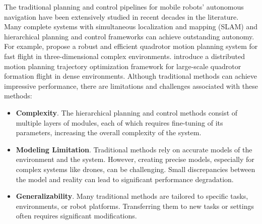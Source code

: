 \documentclass{article}
\newcommand{\TB}[1]{\textbf{#1}}
\begin{document}
The traditional planning and control pipelines for mobile robots' 
autonomous navigation have been extensively studied in recent
decades in the literature. 
Many complete systems with simultaneous localization 
and mapping (SLAM) and hierarchical 
planning and control frameworks can achieve outstanding 
autonomy.
For example, {\textcite{zhou2019robust}} propose a robust and efficient 
quadrotor motion planning system for fast flight in 
three-dimensional complex environments.
{\textcite{quan2023robust}} introduce a distributed motion planning 
trajectory optimization framework for large-scale quadrotor 
formation flight in dense environments.
Although traditional methods can achieve impressive performance, 
there are limitations and challenges associated with these methods: 
\begin{itemize}
  \item \TB{Complexity}. The hierarchical planning and control 
  methods consist of multiple layers of modules,   
  each of which requires fine-tuning of 
  its parameters, increasing the overall complexity of the system.
  \item \TB{Modeling Limitation}. Traditional methods rely on 
  accurate models of the environment and the system. However, 
  creating precise models, especially for complex systems like 
  drones, can be challenging. Small discrepancies between the 
  model and reality can lead to significant performance 
  degradation. 
  \item \TB{Generalizability}. Many traditional methods are 
  tailored to specific tasks, environments, 
  or robot platforms. Transferring them 
  to new tasks or settings often requires significant 
  modifications. 
\end{itemize}
\end{document}
